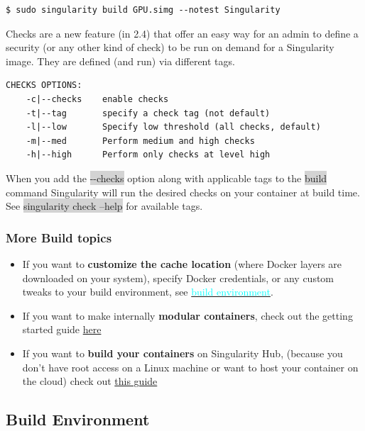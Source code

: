\documentclass[a4paper]{article}
\newcounter{subsubsubsection}[subsubsection]
\begin{document}
\begin{lstlisting}[frame=single]
$ sudo singularity build GPU.simg --notest Singularity
\end{lstlisting}

	
	Checks are a new feature (in 2.4) that offer an easy way for an admin to define a security (or any other kind of check) to be run on demand for a Singularity image. They are defined (and run) via different tags.\\[0.1in]

\begin{lstlisting}[frame=single]
CHECKS OPTIONS:
    -c|--checks    enable checks
    -t|--tag       specify a check tag (not default)
    -l|--low       Specify low threshold (all checks, default) 
    -m|--med       Perform medium and high checks
    -h|--high      Perform only checks at level high
\end{lstlisting}	
    
    When you add the \colorbox{lightgray}{-{}-checks} option along with applicable tags to the \colorbox{lightgray}{build} command Singularity will run the desired checks on your container at build time. See \colorbox{lightgray}{singularity check --help} for available tags.
	
\subsubsection{More Build topics}

\begin{itemize}
\item If you want to \textbf{customize the cache location} (where Docker layers are downloaded on your system), specify Docker credentials, or any custom tweaks to your build environment, see \hyperref[sec:buildenv]{{\textcolor{cyan}{build environment}}}.
\item If you want to make internally \textbf{modular containers}, check out the getting started guide \href{https://sci-f.github.io/tutorials}{here}
\item If you want to \textbf{build your containers} on Singularity Hub, (because you don’t have root access on a Linux machine or want to host your container on the cloud) check out \href{https://github.com/singularityhub/singularityhub.github.io/wiki}{this guide}
\end{itemize}


\subsection{Build Environment}
\label{sec:buildenv}
\end{document}
